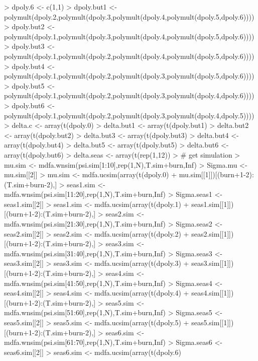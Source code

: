 \documentclass[a4paper]{book}
\begin{document}
\begin{Schunk}
\begin{Sinput}
> dpoly.6 <- c(1,1)
> dpoly.but1 <- polymult(dpoly.2,polymult(dpoly.3,polymult(dpoly.4,polymult(dpoly.5,dpoly.6))))
> dpoly.but2 <- polymult(dpoly.1,polymult(dpoly.3,polymult(dpoly.4,polymult(dpoly.5,dpoly.6))))
> dpoly.but3 <- polymult(dpoly.1,polymult(dpoly.2,polymult(dpoly.4,polymult(dpoly.5,dpoly.6))))
> dpoly.but4 <- polymult(dpoly.1,polymult(dpoly.2,polymult(dpoly.3,polymult(dpoly.5,dpoly.6))))
> dpoly.but5 <- polymult(dpoly.1,polymult(dpoly.2,polymult(dpoly.3,polymult(dpoly.4,dpoly.6))))
> dpoly.but6 <- polymult(dpoly.1,polymult(dpoly.2,polymult(dpoly.3,polymult(dpoly.4,dpoly.5))))
> delta.c <- array(t(dpoly.0) %
> delta.but1 <- array(t(dpoly.but1) %
> delta.but2 <- array(t(dpoly.but2) %
> delta.but3 <- array(t(dpoly.but3) %
> delta.but4 <- array(t(dpoly.but4) %
> delta.but5 <- array(t(dpoly.but5) %
> delta.but6 <- array(t(dpoly.but6) %
> delta.seas <- array(t(rep(1,12)) %
> # get simulation
> mu.sim <- mdfa.wnsim(psi.sim[1:10],rep(1,N),T.sim+burn,Inf)
> Sigma.mu <- mu.sim[[2]]
> mu.sim <- mdfa.ucsim(array(t(dpoly.0) %
+                      mu.sim[[1]])[(burn+1-2):(T.sim+burn-2),]
> seas1.sim <- mdfa.wnsim(psi.sim[11:20],rep(1,N),T.sim+burn,Inf)
> Sigma.seas1 <- seas1.sim[[2]]
> seas1.sim <- mdfa.ucsim(array(t(dpoly.1) %
+                      seas1.sim[[1]])[(burn+1-2):(T.sim+burn-2),]
> seas2.sim <- mdfa.wnsim(psi.sim[21:30],rep(1,N),T.sim+burn,Inf)
> Sigma.seas2 <- seas2.sim[[2]]
> seas2.sim <- mdfa.ucsim(array(t(dpoly.2) %
+                      seas2.sim[[1]])[(burn+1-2):(T.sim+burn-2),]
> seas3.sim <- mdfa.wnsim(psi.sim[31:40],rep(1,N),T.sim+burn,Inf)
> Sigma.seas3 <- seas3.sim[[2]]
> seas3.sim <- mdfa.ucsim(array(t(dpoly.3) %
+                      seas3.sim[[1]])[(burn+1-2):(T.sim+burn-2),]
> seas4.sim <- mdfa.wnsim(psi.sim[41:50],rep(1,N),T.sim+burn,Inf)
> Sigma.seas4 <- seas4.sim[[2]]
> seas4.sim <- mdfa.ucsim(array(t(dpoly.4) %
+                      seas4.sim[[1]])[(burn+1-2):(T.sim+burn-2),]
> seas5.sim <- mdfa.wnsim(psi.sim[51:60],rep(1,N),T.sim+burn,Inf)
> Sigma.seas5 <- seas5.sim[[2]]
> seas5.sim <- mdfa.ucsim(array(t(dpoly.5) %
+                      seas5.sim[[1]])[(burn+1-2):(T.sim+burn-2),]
> seas6.sim <- mdfa.wnsim(psi.sim[61:70],rep(1,N),T.sim+burn,Inf)
> Sigma.seas6 <- seas6.sim[[2]]
> seas6.sim <- mdfa.ucsim(array(t(dpoly.6) %

\end{Sinput}
\end{Schunk}
\end{document}
